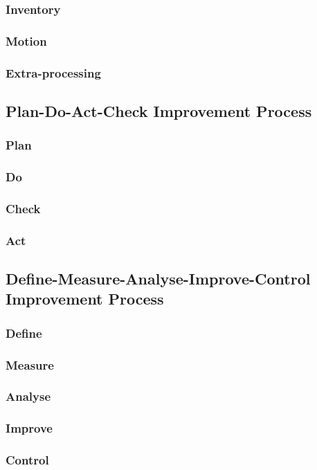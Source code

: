 \documentclass{acm_proc_article-sp}
\begin{document}
\subsubsection{Inventory}
\subsubsection{Motion}
\subsubsection{Extra-processing}
\subsection{Plan-Do-Act-Check Improvement Process}
\subsubsection{Plan}
\subsubsection{Do}
\subsubsection{Check}
\subsubsection{Act}
\subsection{Define-Measure-Analyse-Improve-Control Improvement Process}
\subsubsection{Define}
\subsubsection{Measure}
\subsubsection{Analyse}
\subsubsection{Improve}
\subsubsection{Control}
\end{document}
